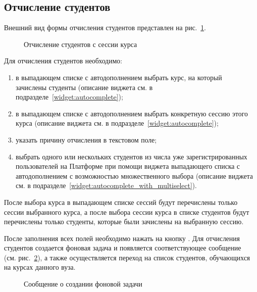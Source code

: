 \subsection{Отчисление студентов}
Внешний вид формы отчисления студентов представлен на рис.~\ref{img:student:unenroll}. 

\begin{figure}[H]
	\caption{Отчисление студентов с сессии курса}
	\label{img:student:unenroll}
\end{figure}


Для отчисления студентов необходимо:
\begin{enumerate}
	\item в выпадающем списке с автодополнением выбрать курс, на который зачислены студенты 
	(описание виджета см. в подразделе~\ref{widget:autocomplete});
	\item в выпадающем списке с автодополнением выбрать конкретную сессию этого курса 
	(описание виджета см. в подразделе~\ref{widget:autocomplete});
	\item указать причину отчисления в текстовом поле; 
	\item выбрать одного или нескольких студентов из числа уже зарегистрированных пользователей на Платформе при помощи 
	виджета выпадающего списка с автодополнением с возможностью множественного выбора 
	(описание виджета см. в подразделе~\ref{widget:autocomplete_with_multiselect}). 
\end{enumerate}

После выбора курса в выпадающем списке сессий будут перечислены только сессии выбранного курса, 
а после выбора сессии курса в списке студентов будут перечислены только студенты, 
которые были зачислены на выбранную сессию.

После заполнения всех полей необходимо нажать на кнопку . Для отчисления студентов создается 
фоновая задача и появляется соответствующее сообщение (см. рис.~\ref{img:student:student_unenroll_task}), 
а также осуществляется переход на список студентов, обучающихся на курсах данного вуза.
\begin{figure}[H]
	\caption{Сообщение о создании фоновой задачи}
	\label{img:student:student_unenroll_task}
\end{figure}

